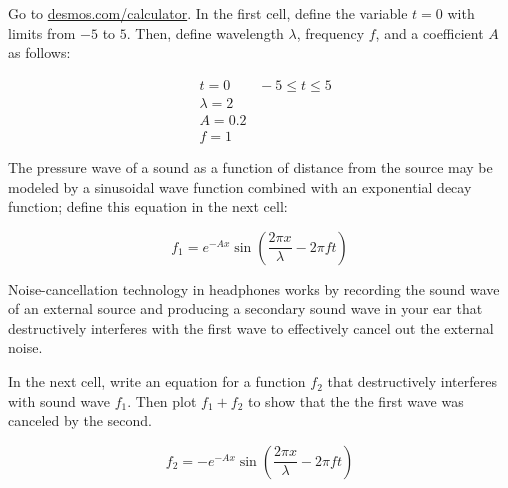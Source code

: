 \documentclass[../main-physics-problems.tex]{subfiles}
\begin{document}
\begin{questions}


\question
Go to \href{https://www.desmos.com/calculator}{desmos.com/calculator}. In the first cell, define the variable $t = 0$ with limits from $-5$ to $5$. Then, define wavelength $\lambda$, frequency $f$, and a coefficient $A$ as follows:

\begin{align*}
    & t = 0 \qquad -5 \leq t \leq 5 \\[1ex]
    & \lambda = 2 \\[1ex]
    & A = 0.2 \\[1ex]
    & f = 1
\end{align*}

The pressure wave of a sound as a function of distance from the source may be modeled by a sinusoidal wave function combined with an exponential decay function; define this equation in the next cell:

\begin{equation*}
    f_1 = e^{-Ax} \sin\left(\frac{2\pi x}{\lambda} - 2\pi f t\right)
\end{equation*}

Noise-cancellation technology in headphones works by recording the sound wave of an external source and producing a secondary sound wave in your ear that destructively interferes with the first wave to effectively cancel out the external noise.

In the next cell, write an equation for a function $f_2$ that destructively interferes with sound wave $f_1$. Then plot $f_1 + f_2$ to show that the the first wave was canceled by the second.

\begin{solution}
\begin{equation*}
    f_2 = -e^{-Ax} \sin\left(\frac{2\pi x}{\lambda} - 2\pi f t\right)
\end{equation*}    
\end{solution}

\end{questions}




\end{document}
